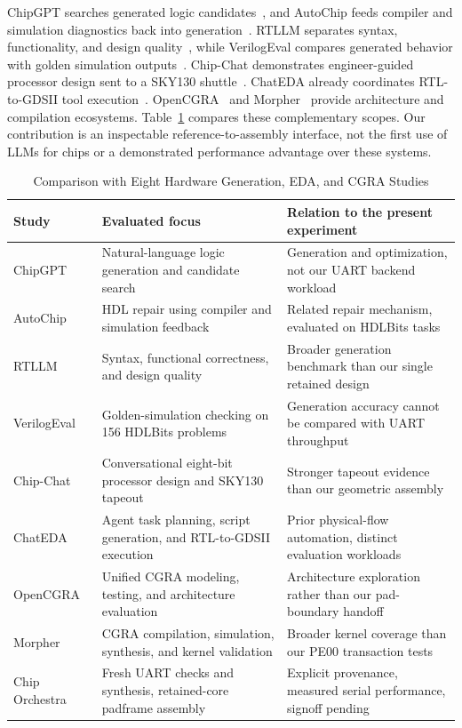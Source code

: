\documentclass[conference,letterpaper]{IEEEtran}
\begin{document}
ChipGPT searches generated logic candidates~\cite{chipgpt}, and AutoChip feeds compiler and simulation diagnostics back into generation~\cite{autochip}. RTLLM separates syntax, functionality, and design quality~\cite{rtllm}, while VerilogEval compares generated behavior with golden simulation outputs~\cite{verilogeval}. Chip-Chat demonstrates engineer-guided processor design sent to a SKY130 shuttle~\cite{chipchat}. ChatEDA already coordinates RTL-to-GDSII tool execution~\cite{chateda}. OpenCGRA~\cite{opencgra} and Morpher~\cite{morpher} provide architecture and compilation ecosystems. Table~\ref{tab:related} compares these complementary scopes. Our contribution is an inspectable reference-to-assembly interface, not the first use of LLMs for chips or a demonstrated performance advantage over these systems.

\begin{table}[t]
\caption{Comparison with Eight Hardware Generation, EDA, and CGRA Studies}
\label{tab:related}\centering\footnotesize
\begin{tabular}{p{1.0in}p{2.8in}p{2.8in}}\toprule
Study & Evaluated focus & Relation to the present experiment\\\midrule
ChipGPT~\cite{chipgpt} & Natural-language logic generation and candidate search & Generation and optimization, not our UART backend workload\\
AutoChip~\cite{autochip} & HDL repair using compiler and simulation feedback & Related repair mechanism, evaluated on HDLBits tasks\\
RTLLM~\cite{rtllm} & Syntax, functional correctness, and design quality & Broader generation benchmark than our single retained design\\
VerilogEval~\cite{verilogeval} & Golden-simulation checking on 156 HDLBits problems & Generation accuracy cannot be compared with UART throughput\\
Chip-Chat~\cite{chipchat} & Conversational eight-bit processor design and SKY130 tapeout & Stronger tapeout evidence than our geometric assembly\\
ChatEDA~\cite{chateda} & Agent task planning, script generation, and RTL-to-GDSII execution & Prior physical-flow automation, distinct evaluation workloads\\
OpenCGRA~\cite{opencgra} & Unified CGRA modeling, testing, and architecture evaluation & Architecture exploration rather than our pad-boundary handoff\\
Morpher~\cite{morpher} & CGRA compilation, simulation, synthesis, and kernel validation & Broader kernel coverage than our PE00 transaction tests\\
Chip Orchestra & Fresh UART checks and synthesis, retained-core padframe assembly & Explicit provenance, measured serial performance, signoff pending\\\bottomrule
\end{tabular}
\end{table}
\end{document}
